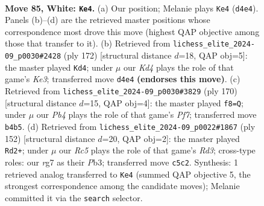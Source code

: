 \documentclass[11pt]{article}
\begin{document}
\clearpage

\begin{figure}[p]\centering
\begin{subfigure}{0.46\textwidth}\centering
\resizebox{\linewidth}{!}{%
\newchessgame
\chessboard[
  setfen={1R6/4kbr1/8/2R5/1P1K4/8/8/8 w - - 43 85},
  showmover=false,
  pgfstyle=straightmove, color=movearrow, markmove={d4-e4}
]}
\caption{}
\end{subfigure}\hfill
\begin{subfigure}{0.46\textwidth}\centering
\resizebox{\linewidth}{!}{%
\newchessgame
\chessboard[
  setfen={8/4r3/3kb3/8/8/4K3/5R2/8 w - - 4 87},
  showmover=false,
  pgfstyle=straightmove, color=movearrow, markmove={e3-d4}
]}
\caption{}
\end{subfigure}
\\[4pt]
\begin{subfigure}{0.46\textwidth}\centering
\resizebox{\linewidth}{!}{%
\newchessgame
\chessboard[
  setfen={4R3/5P2/6K1/3k4/3b4/8/8/8 w - - 9 86},
  showmover=false,
  pgfstyle=straightmove, color=movearrow, markmove={f7-f8}
]}
\caption{}
\end{subfigure}\hfill
\begin{subfigure}{0.46\textwidth}\centering
\resizebox{\linewidth}{!}{%
\newchessgame
\chessboard[
  setfen={1b6/8/8/8/4K2p/1P1R4/6k1/8 w - - 48 77},
  showmover=false,
  pgfstyle=straightmove, color=movearrow, markmove={d3-d2}
]}
\caption{}
\end{subfigure}
\caption{\textbf{Move 85, White: \texttt{Ke4}.} (a) Our position; Melanie plays \texttt{Ke4} (\texttt{d4e4}). Panels (b)--(d) are the retrieved master positions whose correspondence most drove this move (highest QAP objective among those that transfer to it). (b) Retrieved from \texttt{lichess\_elite\_2024-09\_p0030\#2428} (ply 172) [structural distance $d$=18, QAP obj=5]: the master played \texttt{Kd4}; under $\mu$ our \emph{Kd4} plays the role of that game's \emph{Ke3}; transferred move \texttt{d4e4} \textbf{(endorses this move)}. (c) Retrieved from \texttt{lichess\_elite\_2024-09\_p0030\#3829} (ply 170) [structural distance $d$=15, QAP obj=4]: the master played \texttt{f8=Q}; under $\mu$ our \emph{Pb4} plays the role of that game's \emph{Pf7}; transferred move \texttt{b4b5}. (d) Retrieved from \texttt{lichess\_elite\_2024-09\_p0022\#1867} (ply 152) [structural distance $d$=20, QAP obj=2]: the master played \texttt{Rd2+}; under $\mu$ our \emph{Rc5} plays the role of that game's \emph{Rd3}; cross-type roles: our \emph{r}g7 as their \emph{P}b3; transferred move \texttt{c5c2}. Synthesis: 1 retrieved analog transferred to \texttt{Ke4} (summed QAP objective 5, the strongest correspondence among the candidate moves); Melanie committed it via the \texttt{search} selector.}
\label{fig:thought-m168}
\end{figure}
\end{document}
